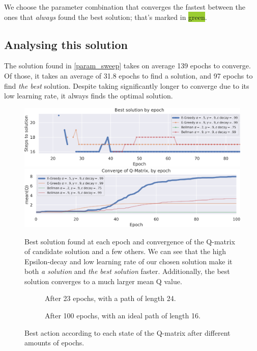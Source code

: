 We choose the parameter combination that converges the fastest between the ones that \emph{always} found the best solution; that's marked in \colorbox{YellowGreen}{green}.

\subsection{Analysing this solution}
The solution found in \cref{param_sweep} takes on average 139 epochs to converge.
Of those, it takes an average of 31.8 epochs to find a solution, and 97 epochs to find \emph{the best} solution.
Despite taking significantly longer to converge due to its low learning rate, it always finds the optimal solution.

\begin{figure}[H]
	\centering
	\includegraphics[width=\textwidth]{task1_best_solution_by_epoch.png} \\[1ex]
	\includegraphics[width=\textwidth]{task1_qmatrix_convergence.png}
	\caption{Best solution found at each epoch and convergence of the Q-matrix of candidate solution and a few others. We can see that the high Epsilon-decay and low learning rate of our chosen solution make it both \emph{a solution} and \emph{the best solution} faster. Additionally, the best solution converges to a much larger mean Q value.}
\end{figure}

\vspace{-13pt}

\renewcommand{\textuparrow}{\ensuremath{\upa{}}}
\renewcommand{\textdownarrow}{\ensuremath{\downa{}}}
\renewcommand{\textleftarrow}{\ensuremath{\lefta{}}}
\renewcommand{\textrightarrow}{\ensuremath{\righta{}}}
\begin{figure}[H]
	\centering
	\begin{subfigure}{.42\textwidth}
		\caption{After 23 epochs, with a path of length 24.}
	\end{subfigure}
	\begin{subfigure}{.42\textwidth}
		\caption{After 100 epochs, with an ideal path of length 16.}
	\end{subfigure}
	\caption{Best action according to each state of the Q-matrix after different amounts of epochs.}
\end{figure}
